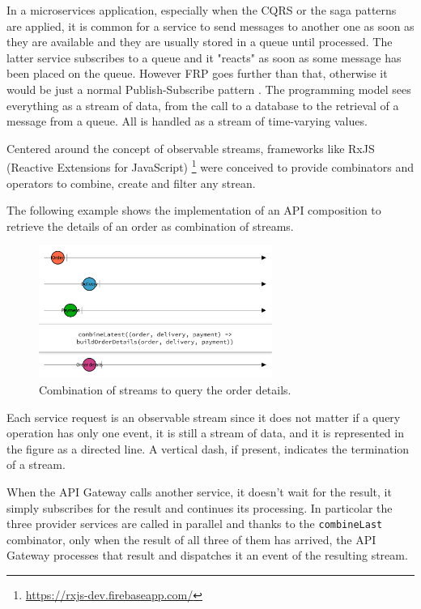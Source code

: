 \documentclass[conference]{IEEEtran}
\begin{document}
In a microservices application, especially when the CQRS or the saga patterns are applied, it is common for a service to send messages to another one as soon as they are available and they are usually stored in a queue until processed. The latter service subscribes to a queue and it "reacts" as soon as some message has been placed on the queue. However FRP goes further than that, otherwise it would be just a normal Publish-Subscribe pattern \cite{pubsub}. The programming model sees everything as a stream of data, from the call to a database to the retrieval of a message from a queue. All is handled as a stream of time-varying values.

Centered around the concept of observable streams, frameworks like RxJS (Reactive Extensions for JavaScript) \footnote{\url{https://rxjs-dev.firebaseapp.com/}} were conceived to provide combinators and operators to combine, create and filter any strean.

The following example shows the implementation of an API composition to retrieve the details of an order as combination of streams.

\begin{figure}[!htbp]
\centering
\includegraphics[width=3in]{jpeg/rx-orders}
\caption{Combination of streams to query the order details.}
\label{rx-orders}
\end{figure}

Each service request is an observable stream since it does not matter if a query operation has only one event, it is still a stream of data, and it is represented in the figure as a directed line. A vertical dash, if present, indicates the termination of a stream.

When the API Gateway calls another service, it doesn't wait for the result, it simply subscribes for the result and continues its processing. In particolar the three provider services are called in parallel and thanks to the \texttt{combineLast} combinator, only when the result of all three of them has arrived, the API Gateway processes that result and dispatches it an event of the resulting stream.
\end{document}

